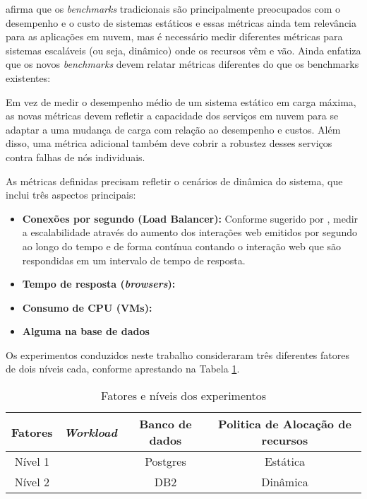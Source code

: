 \cite{Binnig2009} afirma que os \textit{benchmarks} tradicionais são principalmente preocupados com o desempenho e o custo de sistemas estáticos e essas métricas ainda tem relevância para as aplicações em nuvem, mas é necessário medir diferentes métricas para sistemas escaláveis (ou seja, dinâmico) onde os recursos vêm e vão. Ainda \cite{Binnig2009} enfatiza que os novos \textit{benchmarks} devem relatar métricas diferentes do que os benchmarks existentes: 
\begin{citacao}
	Em vez de medir o desempenho médio de um sistema estático em carga máxima, as novas métricas devem refletir a capacidade dos serviços em nuvem para se adaptar a uma mudança de carga com relação ao desempenho e custos. Além disso, uma métrica adicional também deve cobrir a robustez desses serviços contra falhas de nós individuais.
\end{citacao}

As métricas definidas precisam refletir o cenários de dinâmica do sistema, que inclui três aspectos principais:
\begin{itemize}
	\item \textbf{Conexões por segundo (Load Balancer):} Conforme sugerido por \cite{Binnig2009}, medir a escalabilidade através do aumento dos interações web emitidos por segundo ao longo do tempo e de forma contínua contando o interação web que são respondidas em um intervalo de tempo de resposta.
	\item \textbf{Tempo de resposta (\textit{browsers}):}
	\item \textbf{Consumo de CPU (VMs):}
	\item \textbf{Alguma na base de dados}
\end{itemize}


Os experimentos conduzidos neste trabalho consideraram três diferentes fatores de dois níveis cada, conforme aprestando na Tabela \ref{tab:fatores_niveis}. 

\begin{table}[htb]
	\centering
	\caption{Fatores e níveis dos experimentos}
	\label{tab:fatores_niveis}
	\begin{tabularx}{\textwidth}{|c|c|c|c|} \hline\hline
		Fatores  & \textit{Workload} & Banco de dados & Politica de Alocação de recursos\\ \hline
		Nível 1  &         			 & Postgres 	  & Estática                        \\
		Nível 2  &            		 & DB2 			  & Dinâmica                        \\
		\hline
	\end{tabularx}
	\fdadospesquisa
\end{table}


